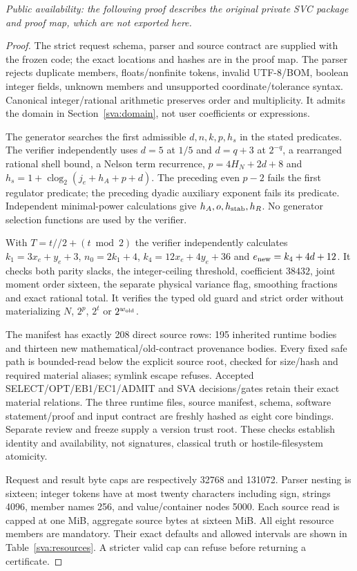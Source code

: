 \noindent\emph{Public availability: the following proof describes the original
private SVC package and proof map, which are not exported here.}

\begin{proof}
The strict request schema, parser and source contract are supplied with
the frozen code; the exact locations and hashes are in the proof map.
The parser rejects duplicate members, floats/nonfinite tokens, invalid
UTF-8/BOM, boolean integer fields, unknown members and unsupported
coordinate/tolerance syntax. Canonical integer/rational arithmetic
preserves order and multiplicity. It admits the domain in
Section~\ref{sva:domain}, not user coefficients or expressions.

The generator searches the first admissible $d,n,k,p,h_s$ in the stated
predicates. The verifier independently uses $d=5$ at $1/5$ and $d=q+3$
at $2^{-q}$, a rearranged rational shell bound, a Nelson term recurrence,
$p=4H_N+2d+8$ and $h_s=1+\operatorname{clog}_2(j_e+h_A+p+d)$.
The preceding even $p-2$ fails the first regulator predicate; the
preceding dyadic auxiliary exponent fails its predicate. Independent
minimal-power calculations give $h_A,o,h_{\rm stab},h_R$.
No generator selection functions are used by the verifier.

With $T=t\mathbin{//}2+(t\bmod2)$ the verifier independently calculates
$k_1=3x_e+y_e+3$, $n_0=2k_1+4$, $k_4=12x_e+4y_e+36$ and
$e_{\rm new}=k_4+4d+12$. It checks both parity slacks, the integer-ceiling
threshold, coefficient $38432$, joint moment order sixteen, the separate
physical variance flag, smoothing fractions and exact rational total.
It verifies the typed old guard and strict order without materializing
$N$, $2^p$, $2^t$ or $2^{w_{\rm old}}$.

The manifest has exactly 208 direct source rows: 195 inherited runtime
bodies and thirteen new mathematical/old-contract provenance bodies.
Every fixed safe path is bounded-read below the explicit source root,
checked for size/hash and required material aliases; symlink escape
refuses. Accepted SELECT/OPT/EB1/EC1/ADMIT and SVA decisions/gates retain
their exact material relations. The three runtime files, source manifest,
schema, software statement/proof and input contract are freshly hashed
as eight core bindings. Separate review and freeze supply a
version trust root. These checks establish identity and availability,
not signatures, classical truth or hostile-filesystem atomicity.

Request and result byte caps are respectively 32768 and 131072. Parser
nesting is sixteen; integer tokens have at most twenty characters
including sign, strings 4096, member names 256, and value/container nodes
5000. Each source read is capped at one MiB, aggregate source bytes at
sixteen MiB. All eight resource members are mandatory. Their exact
defaults and allowed intervals are shown in Table~\ref{sva:resources}.
A stricter valid cap can refuse before returning a certificate.


\end{proof}
